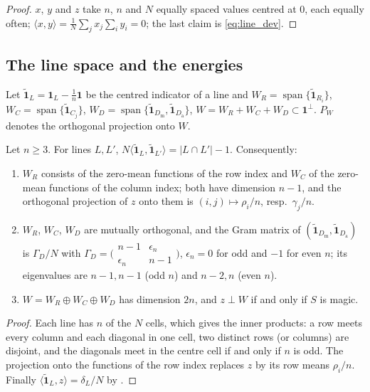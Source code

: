 \begin{proof}
$x$, $y$ and $z$ take $n$, $n$ and $N$ equally spaced values centred at $0$, each equally often; $\langle x,y\rangle=\frac1N\sum_jx_j\sum_iy_i=0$; the last claim is \eqref{eq:line_dev}.
\end{proof}

\subsection{The line space and the energies}
\label{sec:theory_projection}

Let $\tilde{\mathbf 1}_L=\mathbf 1_L-\frac1n\mathbf 1$ be the centred indicator of a line and
$W_R=\operatorname{span}\{\tilde{\mathbf 1}_{R_i}\}$, $W_C=\operatorname{span}\{\tilde{\mathbf 1}_{C_j}\}$, $W_D=\operatorname{span}\{\tilde{\mathbf 1}_{D_{\mathrm m}},\tilde{\mathbf 1}_{D_{\mathrm a}}\}$, $W=W_R+W_C+W_D\subset\mathbf 1^\perp$.
$P_W$ denotes the orthogonal projection onto $W$.

\begin{lemma}
\label{lem:W_structure}
Let $n\ge3$.  For lines $L,L'$, $N\langle\tilde{\mathbf 1}_L,\tilde{\mathbf 1}_{L'}\rangle=|L\cap L'|-1$.  Consequently:
\begin{enumerate}
\item $W_R$ consists of the zero-mean functions of the row index and $W_C$ of the zero-mean functions of the column index; both have dimension $n-1$, and the orthogonal projection of $z$ onto them is $(i,j)\mapsto\rho_i/n$, resp.\ $\gamma_j/n$.
\item $W_R$, $W_C$, $W_D$ are mutually orthogonal, and the Gram matrix of $(\tilde{\mathbf 1}_{D_{\mathrm m}},\tilde{\mathbf 1}_{D_{\mathrm a}})$ is $\Gamma_D/N$ with $\Gamma_D=\bigl(\begin{smallmatrix}n-1&\epsilon_n\\ \epsilon_n&n-1\end{smallmatrix}\bigr)$, $\epsilon_n=0$ for odd and $-1$ for even $n$; its eigenvalues are $n-1,n-1$ (odd $n$) and $n-2,n$ (even $n$).
\item $W=W_R\oplus W_C\oplus W_D$ has dimension $2n$, and $z\perp W$ if and only if $S$ is magic.
\end{enumerate}
\end{lemma}

\begin{proof}
Each line has $n$ of the $N$ cells, which gives the inner products: a row meets every column and each diagonal in one cell, two distinct rows (or columns) are disjoint, and the diagonals meet in the centre cell if and only if $n$ is odd.  The projection onto the functions of the row index replaces $z$ by its row means $\rho_i/n$.  Finally $\langle\tilde{\mathbf 1}_L,z\rangle=\delta_L/N$ by .
\end{proof}

